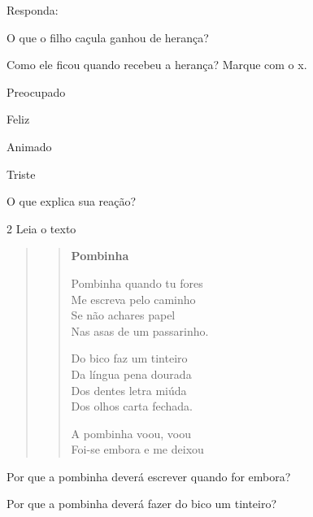 Responda:

\begin{escolha}
\item O que o filho caçula ganhou de herança?


\item Como ele ficou quando recebeu a herança? Marque com o x.

\begin{boxlist}
 Preocupado

 Feliz

 Animado

 Triste
\end{boxlist}

\item O que explica sua reação?

\end{escolha}

\pagebreak
\num{2} Leia o texto

\begin{quote}
\begin{verse}
\textbf{Pombinha}

Pombinha quando tu fores\\
Me escreva pelo caminho\\
Se não achares papel\\
Nas asas de um passarinho.

Do bico faz um tinteiro\\
Da língua pena dourada\\
Dos dentes letra miúda\\
Dos olhos carta fechada.

A pombinha voou, voou\\
Foi-se embora e me deixou
\end{verse}

\end{quote}

\begin{escolha}
\item Por que a pombinha deverá escrever quando for embora?


\item Por que a pombinha deverá fazer do bico um tinteiro?


\end{escolha}

